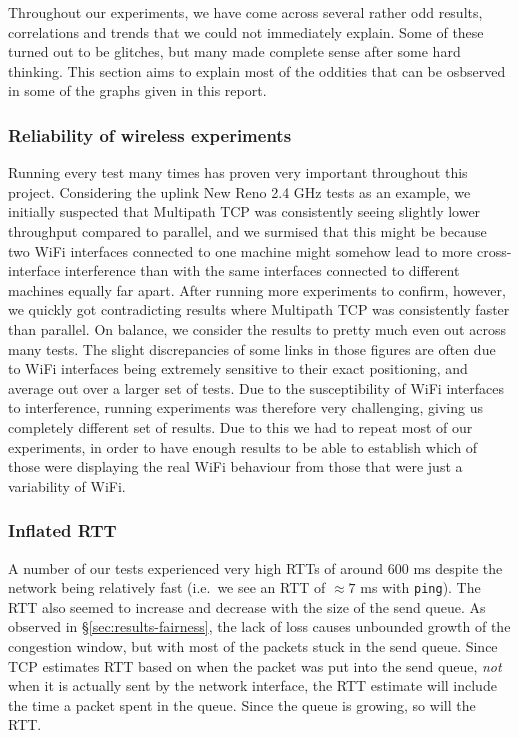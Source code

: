 Throughout our experiments, we have come across several rather odd results,
correlations and trends that we could not immediately explain. Some of these
turned out to be glitches, but many made complete sense after some hard
thinking. This section aims to explain most of the oddities that can be osbserved
in some of the graphs given in this report.

\subsubsection{Reliability of wireless experiments}
Running every test many times has proven very important throughout this project.
Considering the uplink New Reno 2.4 GHz tests as an example, we initially 
suspected that Multipath TCP was consistently seeing slightly lower 
throughput compared to parallel, and we surmised that this might be because two 
WiFi interfaces connected to one machine might somehow lead to more 
cross-interface interference than with the same interfaces connected to 
different machines equally far apart. After running more experiments to confirm, 
however, we quickly got contradicting results where Multipath TCP was 
consistently faster than parallel. On balance, we consider the results to pretty 
much even out across many tests. The slight discrepancies of some links in those 
figures are often due to WiFi interfaces being extremely sensitive to their 
exact positioning, and average out over a larger set of tests.
Due to the susceptibility of WiFi interfaces to interference, running experiments was therefore very challenging, giving us completely different set of results. Due to this we had to repeat most of our experiments, in order to have enough results to be able to establish which of those were displaying the real WiFi behaviour from those that were just a variability of WiFi. 

\subsubsection{Inflated RTT}
A number of our tests experienced very high RTTs of around 600 ms despite the network
being relatively fast (i.e.\ we see an RTT of $\approx 7$ ms with \texttt{ping}).
The RTT also seemed to increase and decrease with the size of the send queue. As 
observed in \S\ref{sec:results-fairness}, the lack of loss causes 
unbounded growth of the congestion window, but with most of the packets stuck in 
the send queue. Since TCP estimates RTT based on when the packet was put into 
the send queue, \emph{not} when it is actually sent by the network interface, 
the RTT estimate will include the time a packet spent in the queue. Since the 
queue is growing, so will the RTT.


